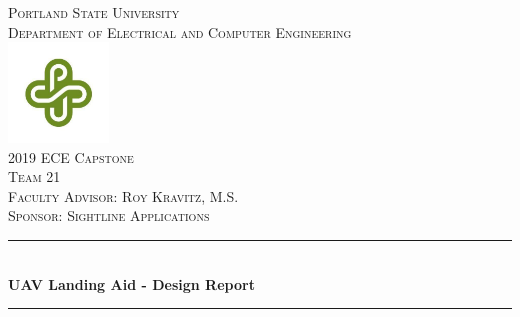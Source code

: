 \documentclass[11pt]{article}
\begin{document}

\begin{titlepage} %
	\newcommand{\HRule}{\rule{\linewidth}{0.5mm}} %
	
	\center %
	
	
	\textsc{\LARGE Portland State University
}\\[.25cm] %
	
	\textsc{\Large Department of Electrical and Computer Engineering }\\[1cm] %
\includegraphics[width=0.2\textwidth]{psuLOGO.jpg}\\[1cm]	
	\textsc{\LARGE2019  ECE Capstone }\\[0.12cm] %
	\textsc{\LARGE Team 21 }\\[0.12cm]	
		\textsc{\Large Faculty Advisor: Roy Kravitz, M.S. }\\[0.12cm]
		\textsc{\Large Sponsor: Sightline Applications }\\[1cm]
	
	
	\HRule\\[0.4cm]
	
	{\huge\bfseries UAV Landing Aid - Design Report}\\[0.4cm] %
	
	\HRule\\[1.5cm]
	
	


\end{titlepage}
\end{document}
